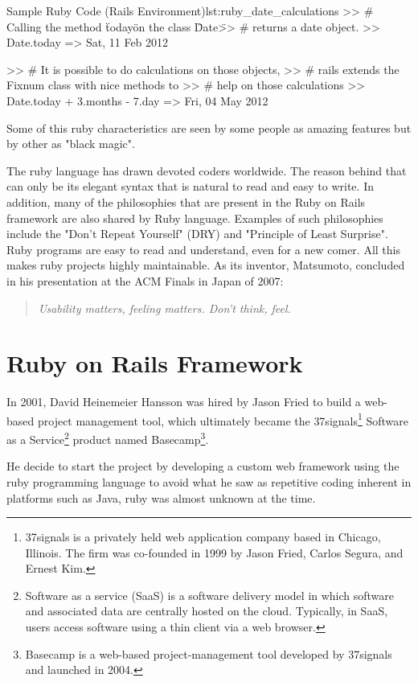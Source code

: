 \begin{rubycode}{Sample Ruby Code (Rails Environment)}{lst:ruby_date_calculations}
  >> # Calling the method \"today\" on the class \"Date\" 
  >> # returns a date object.
  >> Date.today 
  => Sat, 11 Feb 2012

  >> # It is possible to do calculations on those objects, 
  >> # rails extends the Fixnum class with nice methods to 
  >> # help on those calculations
  >> Date.today + 3.months - 7.day
  => Fri, 04 May 2012
\end{rubycode}

Some of this ruby characteristics are seen by some people as amazing features but by other as "black magic".

The ruby language has drawn devoted coders worldwide.
The reason behind that can only be its elegant syntax that is natural to read and easy to write. 
In addition, many of the philosophies that are present in the Ruby on Rails framework are also shared by Ruby language.
Examples of such philosophies include the "Don't Repeat Yourself" (DRY) and "Principle of Least Surprise".
Ruby programs are easy to read and understand, even for a new comer. 
All this makes ruby projects highly maintainable.
As its inventor, Matsumoto, concluded in his presentation at the ACM Finals in Japan of 2007: 
\begin{quote}\emph{
  Usability matters, feeling matters. Don't think, feel.
}\end{quote}




\section{Ruby on Rails Framework} 
In 2001, David Heinemeier Hansson was hired by Jason Fried to build a web-based project management tool, 
which ultimately became the 
\textsf{37signals}\footnote{
  37signals is a privately held web application company based in Chicago, Illinois. 
  The firm was co-founded in 1999 by Jason Fried, Carlos Segura, and Ernest Kim.
}
\textsf{Software as a Service}\footnote{
 Software as a service (SaaS) is a software delivery model in which software and associated data are centrally hosted on the cloud.
 Typically, in SaaS, users access software using a thin client via a web browser.
}  
product named 
\textsf{Basecamp}\footnote{
  Basecamp is a web-based project-management tool developed by 37signals and launched in 2004.
}.

He decide to start the project by developing a custom web framework using the ruby programming language
to avoid what he saw as repetitive coding inherent in platforms such as Java,
ruby was almost unknown at the time.

